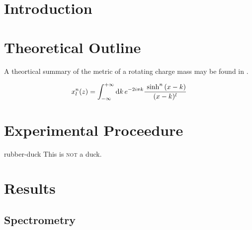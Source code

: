 \documentclass{WitsPhysicsReport}
\begin{document}
\maketitle

\section{Introduction}
\label{sec:Introduction}

\lipsum[1-2]

\section{Theoretical Outline}
\label{sec:Theoretical_Outline}

\par{A theortical summary of the metric of a rotating charge mass may be found in \cite{Newman:1965my}.}

\lipsum[3]

\begin{equation}
    \label{eqn:1}
    x^{n}_{l}(z) = \int^{+\infty}_{-\infty}{\dd k \, e^{-2 i \pi k} \frac{\psinh{x-k}{n}}{(x-k)^{l}}}
\end{equation}

\lipsum[4]

\lipsum[5-6]

\section{Experimental Proceedure}
\label{sec:Experimental Proceedure}

\lipsum[7]

           {rubber-duck}
           {This is \textsc{not} a duck.}

\lipsum[8]

\section{Results}
\label{sec:Results}

\lipsum[9]

\subsection{Spectrometry}
\label{subsec:Spectrometry}

\lipsum[10]

\lipsum[11]
\end{document}
